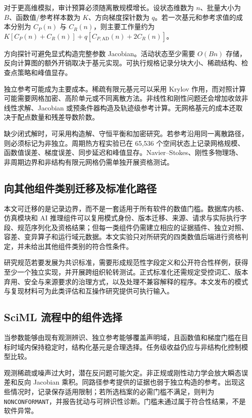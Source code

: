 \documentclass[preprint,12pt,authoryear]{elsarticle}
\begin{document}
对于更高维模拟，审计预算必须随离散规模增长。设状态维数为 $n$、批量大小为 $B$、函数值/参考样本数为 $K$、方向梯度探针数为 $q$。若一次基元和参考求值的成本分别为 $C_P(n)$ 与 $C_R(n)$，则主要工作量约为 $K[C_P(n)+C_R(n)]+q[C_{P,\mathrm{AD}}(n)+2C_R(n)]$。

方向探针可避免显式构造完整参数 Jacobian。活动状态至少需要 $O(Bn)$ 存储，反向计算图的额外开销取决于基元实现。可执行规格记录分块大小、稀疏结构、检查点策略和峰值显存。

独立参考可能成为主要成本。稀疏有限元基元可以采用 Krylov 作用，而对照计算可能需要网格加密、高阶单元或不同离散方法。非线性和刚性问题还会增加收敛非线性求解、Jacobian 或预条件器构造及轨迹级参考计算。无网格基元的成本还取决于配点数量和残差导数阶数。

缺少闭式解时，可采用构造解、守恒平衡和加密研究。若参考沿用同一离散路径，则必须标记为非独立。周期热方程实验已在 65,536 个空间状态上记录网格规模、函数值误差、梯度误差、同步延迟和峰值显存。Navier--Stokes、刚性多物理场、非周期边界和非结构有限元网格仍需单独开展资格测试。

\subsection{向其他组件类别迁移及标准化路径}
本文可迁移的是记录边界，而不是一套适用于所有软件的数值门槛。数据库内核、仿真模块和 AI 推理组件可以复用模式身份、版本迁移、来源、请求与实际执行字段、规范序列化及资格结果；但每一类组件仍需建立相应的证据插件、独立对照、容差、变异算子和运行域元数据。本文实验只对所研究的四类数值后端进行资格判定，并未给出其他组件类别的符合性条件。

研究规范若要发展为共识标准，需要形成规范性字段定义和公开符合性样例，获得至少一个独立实现，并开展跨组织轮转测试。正式标准化还需规定受控词汇、版本弃用、安全与来源要求的治理方式，以及处理不兼容解释的程序。本文发布的模式与复现材料可为此类评估和互操作研究提供可执行输入。

\subsection{SciML 流程中的组件选择}
当参数能够由现有观测辨识、独立参考能够覆盖声明域，且函数值和梯度门槛在目标时域内保持稳定时，结构化基元是合理选择。任务级收益仍应与非结构化控制模型比较。

观测稀疏或噪声过大时，潜在反问题可能欠定。非正规或刚性动力学会放大瞬态误差和反向 Jacobian 乘积。同路径参考提供的证据也弱于独立构造的参考。出现这些情况时，记录保存适用限制；若所选档案的必需门槛不满足，则判为 \texttt{NONCONFORMANT}，并报告扰动与可辨识性诊断。门槛未通过属于符合性结果，不是软件异常。
\end{document}
